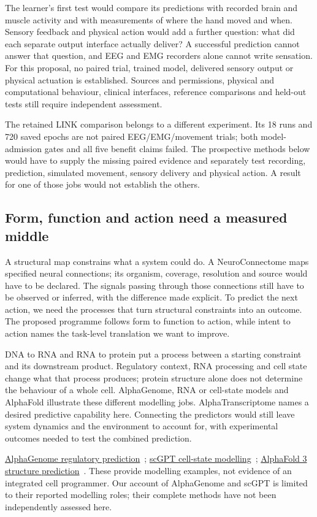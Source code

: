 The learner's first test would compare its predictions with recorded brain
and muscle activity and with measurements of where the hand moved and when.
Sensory feedback and physical action would add a further question: what did
each separate output interface actually deliver? A successful prediction
cannot answer that question, and EEG and EMG recorders alone cannot write
sensation. For this proposal, no paired trial, trained model, delivered sensory
output or physical actuation is established. Sources and permissions, physical
and computational behaviour, clinical interfaces, reference comparisons and
held-out tests still require independent assessment.

The retained LINK comparison belongs to a different experiment. Its 18 runs
and 720 saved epochs are not paired EEG/EMG/movement trials; both model-admission
gates and all five benefit claims failed. The prospective methods below would
have to supply the missing paired evidence and separately test recording,
prediction, simulated movement, sensory delivery and physical action. A result
for one of those jobs would not establish the others.

\subsection{Form, function and action need a measured middle}
A structural map constrains what a system could do. A NeuroConnectome maps
specified neural connections; its organism, coverage, resolution and source
would have to be declared. The signals passing through those connections
still have to be observed or inferred, with the difference made explicit.
To predict the next action, we need the processes that turn structural
constraints into an outcome. The proposed programme follows form to function
to action, while intent to action names the task-level translation we want
to improve.

DNA to RNA and RNA to protein put a process between a starting constraint and
its downstream product. Regulatory context, RNA processing and cell state
change what that process produces; protein structure alone does not determine
the behaviour of a whole cell. AlphaGenome, RNA or cell-state models and
AlphaFold illustrate these different modelling jobs. AlphaTranscriptome names
a desired predictive capability here. Connecting the predictors would still
leave system dynamics and the environment to account for, with experimental
outcomes needed to test the combined prediction.
\par\noindent \href{https://www.nature.com/articles/s41586-025-10014-0}{AlphaGenome regulatory prediction}~\cite{alphagenomeRetained};
\href{https://www.nature.com/articles/s41592-024-02201-0}{scGPT cell-state modelling}~\cite{scgptRetained};
\href{https://www.nature.com/articles/s41586-024-07487-w}{AlphaFold 3 structure prediction}~\cite{abramson2024}.
These provide modelling examples, not evidence of an integrated cell programmer.
Our account of AlphaGenome and scGPT is limited to their reported modelling roles;
their complete methods have not been independently assessed here.

